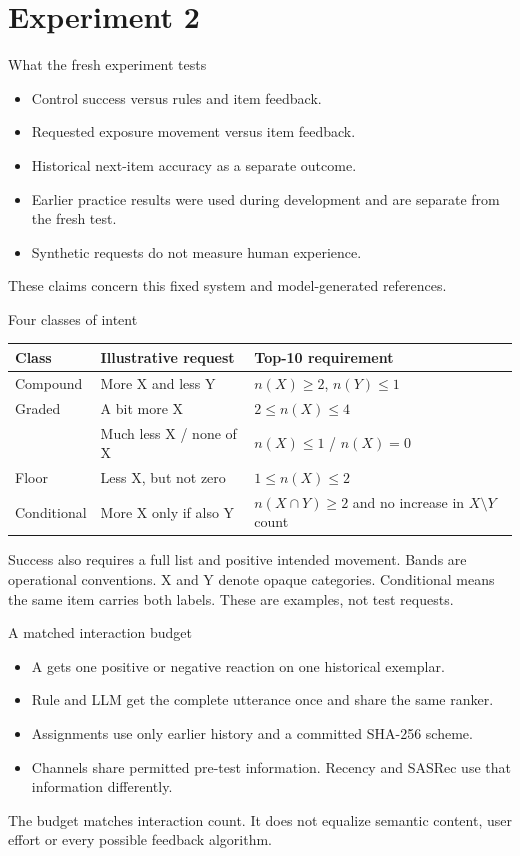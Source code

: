 \documentclass[10pt]{beamer}
\newcommand{\toprule}{\hline}
\newcommand{\midrule}{\hline}
\newcommand{\bottomrule}{\hline}
\newcommand{\src}[1]{\vfill{\tiny\color{bcitgray}#1}}
\begin{document}
\section{Experiment 2}
\begin{frame}{What the fresh experiment tests}
\small
\begin{itemize}
\item Control success versus rules and item feedback.
\item Requested exposure movement versus item feedback.
\item Historical next-item accuracy as a separate outcome.
\item Earlier practice results were used during development and are separate from the fresh test.
\item Synthetic requests do not measure human experience.
\end{itemize}
\vfill
\tiny These claims concern this fixed system and model-generated references.
\end{frame}

\begin{frame}{Four classes of intent}
\small
\begin{tabular}{@{}P{2.0cm}P{4.0cm}P{3.7cm}@{}}
\toprule
Class & Illustrative request & Top-10 requirement\\\midrule
Compound & More X and less Y & $n(X)\geq2$, $n(Y)\leq1$\\[0.18cm]
Graded & A bit more X & $2\leq n(X)\leq4$\\
 & Much less X / none of X & $n(X)\leq1$ / $n(X)=0$\\[0.18cm]
Floor & Less X, but not zero & $1\leq n(X)\leq2$\\[0.18cm]
Conditional & More X only if also Y & $n(X\cap Y)\geq2$ and no increase in $X\setminus Y$ count\\\bottomrule
\end{tabular}\par
\vspace{0.25cm}
Success also requires a full list and positive intended movement. Bands are operational conventions.
\src{X and Y denote opaque categories. Conditional means the same item carries both labels. These are examples, not test requests.}
\end{frame}

\begin{frame}{A matched interaction budget}
\begin{itemize}
\item A gets one positive or negative reaction on one historical exemplar.
\item Rule and LLM get the complete utterance once and share the same ranker.
\item Assignments use only earlier history and a committed SHA-256 scheme.
\item Channels share permitted pre-test information. Recency and SASRec use that information differently.
\end{itemize}
\vspace{0.3cm}
The budget matches interaction count. It does not equalize semantic content, user effort or every possible feedback algorithm.
\end{frame}
\end{document}

